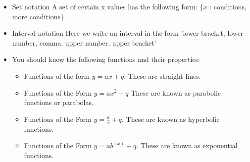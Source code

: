 \begin{enumerate}[noitemsep, label=\textbf{\arabic*}. ]
\begin{itemize}[noitemsep]
\begin{itemize}[noitemsep]
\end{itemize}
\item 
Set notation
A set of certain x values has the following form: \{$x$ : conditions, more conditions\}
\item 
Interval notation
Here we write an interval in the form 'lower bracket, lower number, comma, upper number, upper bracket'
\item  You should know the following functions and their properties:
    \begin{itemize}[noitemsep]
    \item Functions of the form $y=ax+q$. These are straight lines.
    \item Functions of the Form $y=a{x}^{2}+q$ These are known as parabolic functions or parabolas.
    \item Functions of the Form $y=\frac{a}{x}+q$. These are known as hyperbolic functions.
    \item Functions of the Form $y=a{b}^{(x)}+q$. These are known as exponential functions.
    \end{itemize}
\end{itemize}


\end{enumerate}
